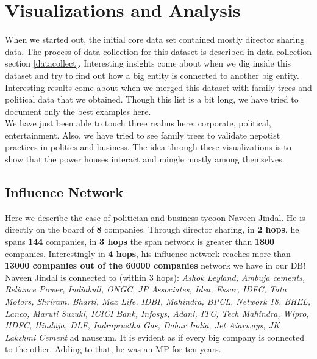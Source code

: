 \chapter{Visualizations and Analysis}
\label{chapviz}

When we started out, the initial core data set contained mostly director sharing data. The process of data collection for this dataset is described in data collection section \ref{datacollect}. Interesting insights come about when we dig inside this dataset and try to find out how a big entity is connected to another big entity. \\

Interesting results come about when we merged this dataset with family trees and political data that we obtained. Though this list is a bit long, we have tried to document only the best examples here. \\

We have just been able to touch three realms here: corporate, political, entertainment.
Also, we have tried to see family trees to validate nepotist practices in politics and business. The idea through these visualizations is to show that the power houses interact and mingle mostly among themselves. \\


\section{Influence Network}

Here we describe the case of politician and business tycoon Naveen Jindal. He is directly on the board of \textbf{8} companies. Through director sharing, in \textbf{2 hops}, he spans \textbf{144} companies, in \textbf{3 hops} the span network is greater than \textbf{1800} companies. Interestingly in \textbf{4 hops}, his influence network reaches more than \textbf{13000 companies out of the 60000 companies} network we have in our DB!  Naveen Jindal is connected to (within 3 hops): \emph{Ashok Leyland, Ambuja cements, Reliance Power, Indiabull, ONGC, JP Associates, Idea, Essar, IDFC, Tata Motors, Shriram, Bharti, Max Life, IDBI, Mahindra, BPCL, Network 18, BHEL, Lanco, Maruti Suzuki, ICICI Bank, Infosys, Adani, ITC, Tech Mahindra, Wipro, HDFC, Hinduja, DLF, Indraprastha Gas, Dabur India, Jet Aiarways, JK Lakshmi Cement} ad nauseum. It is evident as if every big company is connected to the other. Adding to that, he was an MP for ten years.


